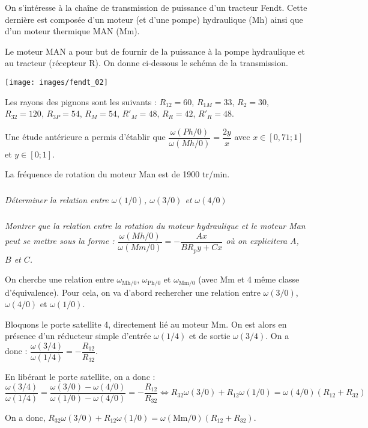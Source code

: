 \documentclass[10pt,fleqn]{article} %
\begin{document}
\begin{multicols}{2}
\begin{multicols}{2}
On s'intéresse à la chaîne de transmission de puissance d'un tracteur Fendt. Cette dernière est composée d'un moteur (et d'une pompe) hydraulique (Mh) ainsi que d'un moteur thermique MAN (Mm). 

Le moteur MAN a pour but de fournir de la puissance à la pompe hydraulique et au tracteur (récepteur R). On donne ci-dessous le schéma de la transmission. 
 
\begin{center}
\texttt{[image: images/fendt\_02]}
\end{center}

Les rayons des pignons sont les suivants : $R_{12}=60$, $R_{1M}=33$, $R_{2}=30$, $R_{32}=120$, $R_{3P}=54$, $R_{M}=54$, $R'_{M}=48$, $R_{R}=42$, $R'_{R}=48$. 

Une étude antérieure a permis d'établir que $\dfrac{\omega(Ph/0)}{\omega(Mh/0)} = \dfrac{2y}{x}$ avec $x\in[0,71;1]$ et $y\in[0;1]$.

La fréquence de rotation du moteur Man est de 1900 tr/min.
\subparagraph{}
\textit{Déterminer la relation entre $\omega(1/0)$, $\omega(3/0)$ et $\omega(4/0)$}

\subparagraph{}
\textit{Montrer que la relation entre la rotation du moteur hydraulique et le moteur Man peut se mettre sous la forme : $\dfrac{\omega(Mh/0)}{\omega(Mm/0)}=-\dfrac{Ax}{BR_py + Cx}$ où on explicitera $A$, $B$ et $C$.}


\ifprof
\newpage
\begin{corrige}
On cherche une relation entre $\omega_{\text{Mh}/0}$, $\omega_{\text{Ph}/0}$ et $\omega_{\text{Mm}/0}$ (avec Mm et 4 même classe d'équivalence). Pour cela, on va d'abord rechercher une relation entre $\omega(3/0)$, $\omega(4/0)$ et $\omega(1/0)$.

Bloquons le porte satellite 4, directement lié au moteur Mm. On est alors en présence d'un réducteur simple d'entrée  $\omega(1/4)$ et de sortie $\omega(3/4)$. On a donc : 
$\dfrac{\omega(3/4)}{\omega(1/4)} = -\dfrac{R_{12}}{R_{32}}$. 

En libérant le porte satellite, on a donc :
$ \dfrac{\omega(3/4)}{\omega(1/4)}
= \dfrac{\omega(3/0)-\omega(4/0)}{\omega(1/0)-\omega(4/0)}
= -\dfrac{R_{12}}{R_{32}}
\Leftrightarrow 
R_{32} \omega(3/0) +R_{12}\omega(1/0) = \omega(4/0)\left(R_{12}+R_{32}\right)$

On a donc, $R_{32} \omega(3/0) +R_{12}\omega(1/0) = \omega(\text{Mm}/0)\left(R_{12}+R_{32}\right)$.


\end{corrige}
\end{multicols}
\end{multicols}
\end{document}
